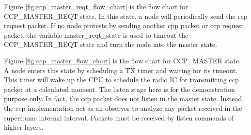 \documentclass[\main/main.tex]{subfiles}
\begin{document}
Figure \ref{fig:ccp_master_reqt_flow_chart} is the flow chart for
CCP\_MASTER\_REQT state. In this state, a node will periodically send the ccp request packet. If no node protests by sending another cpp packet or ccp request packet, the variable master\_reqt\_state is used to timeout the CCP\_MASTER\_REQT state and turn the node into the master state.

Figure \ref{fig:ccp_master_flow_chart} is the flow chart for CCP\_MASTER state. A node enters this state by scheduling a TX timer and waiting for its timeout. This timer will wake up the CPU to schedule the radio IC for transmitting ccp packet at a calculated moment. The listen stage here is for the demonstration purpose only. In fact, the ccp packet does not listen in the master state. Instead, the ccp implementation act as an observer to analyze any packet received in the superframe internal interval. Packets must be received by listen commands of higher layers.
\end{document}
